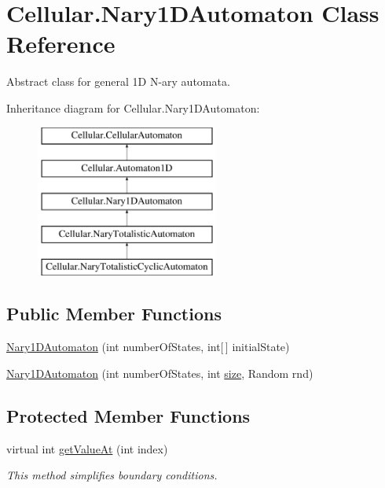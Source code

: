 \hypertarget{class_cellular_1_1_nary1_d_automaton}{}\section{Cellular.\+Nary1\+D\+Automaton Class Reference}
\label{class_cellular_1_1_nary1_d_automaton}


Abstract class for general 1\+D N-\/ary automata.  


Inheritance diagram for Cellular.\+Nary1\+D\+Automaton\+:\begin{figure}[H]
\begin{center}
\leavevmode
\includegraphics[height=5.000000cm]{class_cellular_1_1_nary1_d_automaton}
\end{center}
\end{figure}
\subsection*{Public Member Functions}
\begin{DoxyCompactItemize}
\item 
\hyperlink{class_cellular_1_1_nary1_d_automaton_a9b38ab16780bc9fb347f714bdd8f1295}{Nary1\+D\+Automaton} (int number\+Of\+States, int\mbox{[}$\,$\mbox{]} initial\+State)
\item 
\hyperlink{class_cellular_1_1_nary1_d_automaton_ad9678852ba9ef44a300f2d272757d482}{Nary1\+D\+Automaton} (int number\+Of\+States, int \hyperlink{class_cellular_1_1_automaton1_d_a915129ccf0f1e7092844c99ce6a28e5b}{size}, Random rnd)
\end{DoxyCompactItemize}
\subsection*{Protected Member Functions}
\begin{DoxyCompactItemize}
\item 
virtual int \hyperlink{class_cellular_1_1_nary1_d_automaton_adfd39915b66667efeeb9b16f154b9b6b}{get\+Value\+At} (int index)
\begin{DoxyCompactList}\small\item\em This method simplifies boundary conditions. \end{DoxyCompactList}\end{DoxyCompactItemize}
